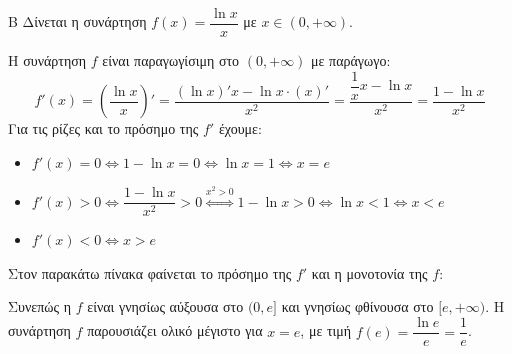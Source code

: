 \begin{thema}{Β}
Δίνεται η συνάρτηση $f(x) = \dfrac{\ln x}{x}$ με $x \in (0, +\infty)$.

\begin{erwthma}
\item Η συνάρτηση $f$ είναι παραγωγίσιμη στο $(0, +\infty)$ με παράγωγο:
\[ f'(x) = \left( \dfrac{\ln x}{x} \right)' = \dfrac{(\ln x)' x - \ln x \cdot (x)'}{x^2} = \dfrac{\dfrac{1}{x}x - \ln x}{x^2} = \dfrac{1 - \ln x}{x^2} \]
Για τις ρίζες και το πρόσημο της $f'$ έχουμε:
\begin{itemize}
    \item $f'(x) = 0 \Leftrightarrow 1 - \ln x = 0 \Leftrightarrow \ln x = 1 \Leftrightarrow x = e$
    \item $f'(x) > 0 \Leftrightarrow \dfrac{1 - \ln x}{x^2} > 0 \stackrel{x^2>0}{\Leftrightarrow} 1 - \ln x > 0 \Leftrightarrow \ln x < 1 \Leftrightarrow x < e$
    \item $f'(x) < 0 \Leftrightarrow x > e$
\end{itemize}
Στον παρακάτω πίνακα φαίνεται το πρόσημο της $f'$ και η μονοτονία της $f$:
\begin{center}
\end{center}
Συνεπώς η $f$ είναι γνησίως αύξουσα στο $(0, e]$ και γνησίως φθίνουσα στο $[e, +\infty)$.
Η συνάρτηση $f$ παρουσιάζει ολικό μέγιστο για $x = e$, με τιμή $f(e) = \dfrac{\ln e}{e} = \dfrac{1}{e}$.


\end{erwthma}
\end{thema}
